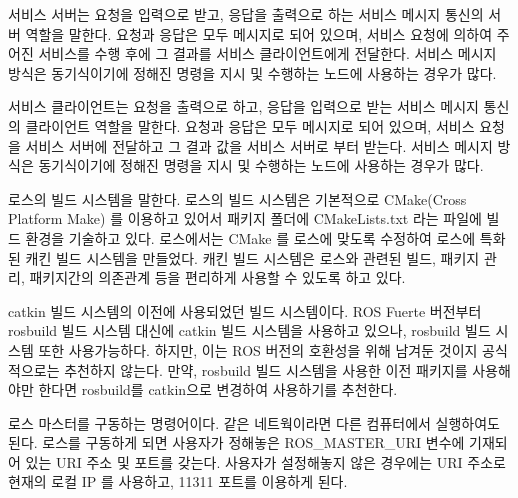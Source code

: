 \begin{definition}\label{def:RosServiceServer}
서비스 서버는 요청을 입력으로 받고, 응답을 출력으로 하는 서비스 메시지 통신의 서버 역할을 말한다. 요청과 응답은 모두 메시지로 되어 있으며, 서비스 요청에 의하여 주어진 서비스를 수행 후에 그 결과를 서비스 클라이언트에게 전달한다. 서비스 메시지 방식은 동기식이기에 정해진 명령을 지시 및 수행하는 노드에 사용하는 경우가 많다.
\end{definition}

\begin{definition}\label{def:RosServiceClient}
서비스 클라이언트는 요청을 출력으로 하고, 응답을 입력으로 받는 서비스 메시지 통신의 클라이언트 역할을 말한다. 요청과 응답은 모두 메시지로 되어 있으며, 서비스 요청을 서비스 서버에 전달하고 그 결과 값을 서비스 서버로 부터 받는다. 서비스 메시지 방식은 동기식이기에 정해진 명령을 지시 및 수행하는 노드에 사용하는 경우가 많다.
\end{definition}

\begin{definition}[캐킨(catkin)]\label{def:RosCatkin}
로스의 빌드 시스템을 말한다. 로스의 빌드 시스템은 기본적으로 CMake(Cross Platform Make) 를 이용하고 있어서 패키지 폴더에 CMakeLists.txt 라는 파일에 빌드 환경을 기술하고 있다. 로스에서는 CMake 를 로스에 맞도록 수정하여 로스에 특화된 캐킨 빌드 시스템을 만들었다. 캐킨 빌드 시스템은 로스와 관련된 빌드, 패키지 관리, 패키지간의 의존관계 등을 편리하게 사용할 수 있도록 하고 있다. 
\end{definition}

\begin{definition}\label{def:RosRosbuild}
catkin 빌드 시스템의 이전에 사용되었던 빌드 시스템이다. ROS Fuerte 버전부터 rosbuild 빌드 시스템 대신에 catkin 빌드 시스템을 사용하고 있으나, rosbuild 빌드 시스템 또한 사용가능하다. 하지만, 이는 ROS 버전의 호환성을 위해 남겨둔 것이지 공식적으로는 추천하지 않는다. 만약, rosbuild 빌드 시스템을 사용한 이전 패키지를 사용해야만 한다면 rosbuild를 catkin으로 변경하여 사용하기를 추천한다. 
\end{definition}

\begin{definition}\label{def:RosCore}
로스 마스터를 구동하는 명령어이다. 같은 네트웍이라면 다른 컴퓨터에서 실행하여도 된다. 로스를 구동하게 되면 사용자가 정해놓은 ROS\_MASTER\_URI 변수에 기재되어 있는 URI 주소 및 포트를 갖는다. 사용자가 설정해놓지 않은 경우에는 URI 주소로 현재의 로컬 IP 를 사용하고, 11311 포트를 이용하게 된다.
\end{definition}

